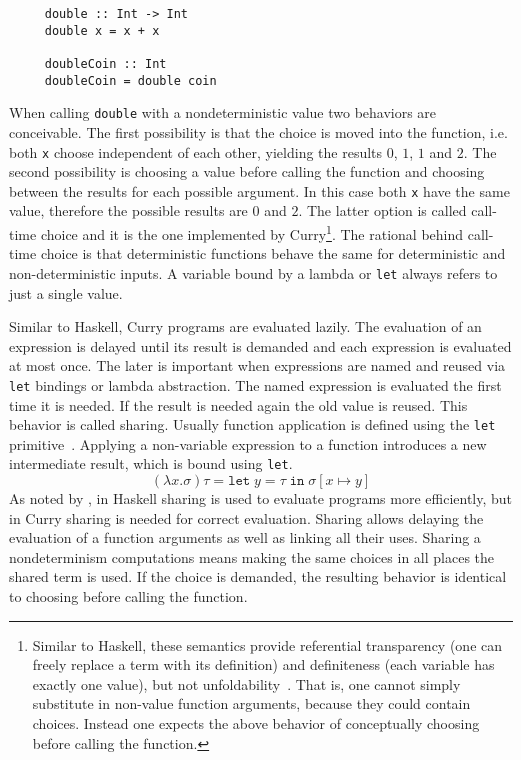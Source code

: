 \begin{verbatim}
     double :: Int -> Int
     double x = x + x
     
     doubleCoin :: Int
     doubleCoin = double coin
\end{verbatim}
When calling \texttt{double} with a nondeterministic value two behaviors are
conceivable.
The first possibility is that the choice is moved into the function, i.e. both
\texttt{x} choose independent of each other, yielding the results $0$, $1$, $1$
and $2$.
The second possibility is choosing a value before calling the function and
choosing between the results for each possible argument.
In this case both \texttt{x} have the same value, therefore the possible results
are $0$ and $2$.
The latter option is called call-time choice and it is the one implemented by
Curry\footnote{
Similar to Haskell, these semantics provide referential transparency (one
can freely replace a term with its definition) and definiteness (each variable has
exactly one value), but not unfoldability~\cite{DBLP:journals/acta/SondergaardS89}.
That is, one cannot simply substitute in non-value function arguments, because
they could contain choices.
Instead one expects the above behavior of conceptually choosing before calling
the function.}.
The rational behind call-time choice is that deterministic functions behave the
same for deterministic and non-deterministic inputs.
A variable bound by a lambda or \texttt{let} always refers to just a single
value.

Similar to Haskell, Curry programs are evaluated lazily.
The evaluation of an expression is delayed until its result is demanded and each
expression is evaluated at most once.
The later is important when expressions are named and reused via \texttt{let}
bindings or lambda abstraction.
The named expression is evaluated the first time it is needed.
If the result is needed again the old value is reused.
This behavior is called sharing.
Usually function application is defined using the \texttt{let}
primitive~\cite{DBLP:conf/popl/Launchbury93}.
Applying a non-variable expression to a function introduces a new intermediate
result, which is bound using \texttt{let}.
$$
(\lambda x.\sigma) \tau = \texttt{let}\;y = \tau\;\texttt{in}\;\sigma[x\mapsto y]
$$
As noted by \textcite{DBLP:journals/corr/abs-2008-11999}, in Haskell sharing is
used to evaluate programs more efficiently, but in Curry sharing is needed for
correct evaluation.
Sharing allows delaying the evaluation of a function arguments as well as
linking all their uses.
Sharing a nondeterminism computations means making the same choices in all
places the shared term is used.
If the choice is demanded, the resulting behavior is identical to choosing
before calling the function.

